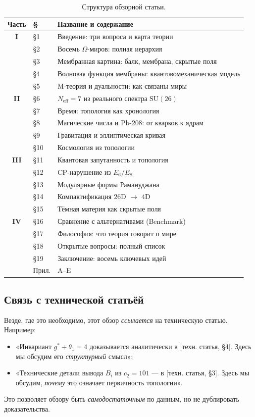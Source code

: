 \documentclass[11pt,a4paper]{article}
\newcommand{\SU}{\mathrm{SU}}
\newcommand{\Neff}{N_{\text{eff}}}
\theoremstyle{definition}
\begin{document}
\begin{table}[htbp]
\centering
\caption{Структура обзорной статьи.}
\label{tab:structure}
\begin{tabular}{clp{7cm}}
\toprule
Часть & § & Название и содержание \\
\midrule
\textbf{I} & §1 & Введение: три вопроса и карта теории \\
 & §2 & Восемь $\Omega$-миров: полная иерархия \\
 & §3 & Мембранная картина: балк, мембрана, скрытые поля \\
 & §4 & Волновая функция мембраны: квантовомеханическая модель \\
 & §5 & M-теория и дуальности: как связаны миры \\
\midrule
\textbf{II} & §6 & $\Neff = 7$ из реального спектра $\SU(26)$ \\
 & §7 & Время: топология как хронология \\
 & §8 & Магические числа и Pb-208: от кварков к ядрам \\
 & §9 & Гравитация и эллиптическая кривая \\
 & §10 & Космология из топологии \\
\midrule
\textbf{III} & §11 & Квантовая запутанность и топология \\
 & §12 & CP-нарушение из $E_6/E_8$ \\
 & §13 & Модулярные формы Рамануджана \\
 & §14 & Компактификация $26$D $\to$ $4$D \\
 & §15 & Тёмная материя как скрытые поля \\
\midrule
\textbf{IV} & §16 & Сравнение с альтернативами (Benchmark) \\
 & §17 & Философия: что теория говорит о мире \\
 & §18 & Открытые вопросы: полный список \\
 & §19 & Заключение: восемь ключевых идей \\
 & Прил. & A--E \\
\bottomrule
\end{tabular}
\end{table}

\subsection{Связь с технической статьёй}

Везде, где это необходимо, этот обзор \emph{ссылается} на 
техническую статью. Например:
\begin{itemize}
    \item «Инвариант $g^* + \theta_1 = 4$ доказывается 
          аналитически в [техн. статья, §4]. Здесь мы 
          обсудим его \emph{структурный} смысл»;
    \item «Технические детали вывода $B_i$ из $c_2 = 101$ — 
          в [техн. статья, §3]. Здесь мы обсудим, \emph{почему} 
          это означает первичность топологии».
\end{itemize}
Это позволяет обзору быть \emph{самодостаточным} по данным, 
но не дублировать доказательства.
\end{document}
